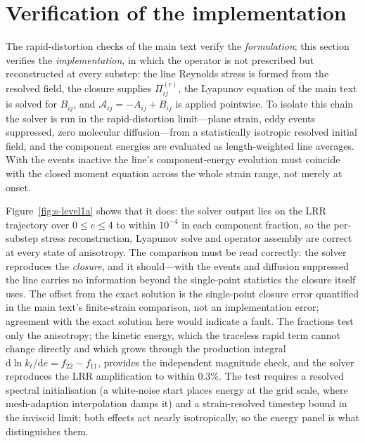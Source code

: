 \documentclass{JFM-FLM_Au}
\begin{document}
\section{Verification of the implementation}\label{sec:s-level1a}

The rapid-distortion checks of the main text verify the
\emph{formulation}; this section verifies the \emph{implementation},
in which the operator is not prescribed but reconstructed at every
substep: the line Reynolds stress is formed from the resolved field,
the closure supplies $\Pi^{(\mathrm r)}_{ij}$, the Lyapunov equation
of the main text is solved for $B_{ij}$, and
$\mathcal{A}_{ij}=-A_{ij}+B_{ij}$ is applied pointwise. To isolate
this chain the solver is run in the rapid-distortion limit---plane
strain, eddy events suppressed, zero molecular diffusion---from a
statistically isotropic resolved initial field, and the component
energies are evaluated as length-weighted line averages. With the
events inactive the line's component-energy evolution must coincide
with the closed moment equation across the whole strain range, not
merely at onset.

Figure~\ref{fig:s-level1a} shows that it does: the solver output lies
on the LRR trajectory over $0\le e\le4$ to within $10^{-4}$ in each
component fraction, so the per-substep stress reconstruction, Lyapunov
solve and operator assembly are correct at every state of anisotropy.
The comparison must be read correctly: the solver reproduces the
\emph{closure}, and it should---with the events and diffusion
suppressed the line carries no information beyond the single-point
statistics the closure itself uses. The offset from the exact solution
is the single-point closure error quantified in the main text's
finite-strain comparison, not an implementation error; agreement with
the exact solution here would indicate a fault. The fractions test
only the anisotropy; the kinetic energy, which the traceless rapid
term cannot change directly and which grows through the production
integral $\mathrm{d}\ln k_t/\mathrm{d}e=f_{22}-f_{11}$, provides the
independent magnitude check, and the solver reproduces the LRR
amplification to within $0.3\%$. The test requires a resolved spectral
initialisation (a white-noise start places energy at the grid scale,
where mesh-adaption interpolation damps it) and a strain-resolved
timestep bound in the inviscid limit; both effects act nearly
isotropically, so the energy panel is what distinguishes them.
\end{document}
